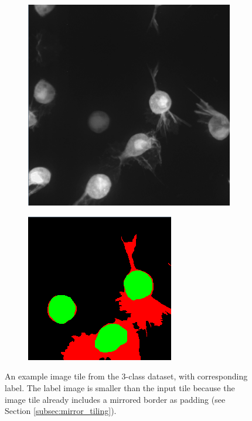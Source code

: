 \begin {figure}[!ht]
	
	\begin {subfigure}[{position=b}]{0.6\linewidth}
		\begin {center}
		\includegraphics[scale=0.65]{img/dataset_ex1.png}
		\end{center}
	\end {subfigure}
	\begin {subfigure}[{position=b}]{0.3\linewidth}
		\begin {center}
		\includegraphics[scale=0.60]{img/dataset_ex2.png}
		\end{center}
	\end {subfigure}

		\caption[]{An example image tile from the 3-class dataset, with corresponding label. The label image is smaller than the input tile because the image tile already includes a mirrored border as padding (see Section \ref{subsec:mirror_tiling}).}
		\label{fig:dataset_example}
	

\end {figure}


